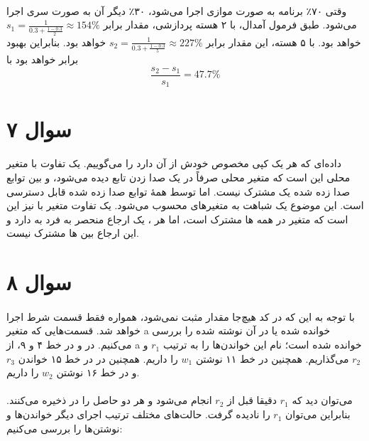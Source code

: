 \documentclass{article}
\begin{document}
	\paragraph*{}
	وقتی ۷۰٪ برنامه به صورت موازی اجرا می‌شود، ۳۰٪ دیگر آن به صورت سری اجرا می‌شود. طبق فرمول آمدال، با ۲ هسته پردازشی، مقدار
	برابر
	$s_1 = \frac{1}{0.3 + \frac{1 - 0.3}{2}} \approx 154\%$
	خواهد بود. با ۵ هسته، این مقدار برابر
	$s_2 = \frac{1}{0.3 + \frac{1 - 0.3}{5}} \approx 227\%$
	خواهد بود. بنابراین بهبود
	برابر خواهد بود با
	\begin{equation*}
		\frac{s_2 - s_1}{s_1} = 47.7\%
	\end{equation*}

	\section*{سوال ۷}
	\paragraph*{}
	داده‌ای که هر
	یک کپی مخصوص خودش از آن دارد را
	می‌گوییم. یک تفاوت
	با متغیر محلی این است که متغیر محلی صرفاً در یک صدا زدن تابع دیده می‌شود، و بین توابع صدا زده شده یک
	مشترک نیست. اما
	توسط همهٔ توابع صدا زده شده قابل دسترسی است. این موضوع یک شباهت به متغیرهای
	محسوب می‌شود. یک تفاوت متغیر
	با
	نیز این است که متغیر
	در همه
	ها
	مشترک است، اما هر
	،
	یک ارجاع منحصر به فرد به
	دارد و این ارجاع بین
	ها
	مشترک نیست.

	\section*{سوال ۸}
	\paragraph*{}
	با توجه به این که در کد هیچ‌جا مقدار
	مثبت نمی‌شود، همواره فقط قسمت
	شرط اجرا خواهد شد. قسمت‌هایی که متغیر a خوانده شده یا در آن نوشته شده را بررسی می‌کنیم. در
	و در خط ۴ و ۹، از a خوانده شده است؛ نام این خواندن‌ها را به ترتیب
	$r_1$
	و
	$r_2$
	می‌گذاریم. همچنین در خط ۱۱ نوشتن
	$w_1$
	را داریم. همچنین در
	در خط ۱۵ خواندن
	$r_3$
	و در خط ۱۶ نوشتن
	$w_2$
	را داریم.

	\paragraph*{}
	می‌توان دید که
	$r_1$
	دقیقا قبل از
	$r_2$
	انجام می‌شود و هر دو حاصل را در
	ذخیره می‌کنند. بنابراین می‌توان
	$r_1$
	را نادیده گرفت. حالت‌های مختلف ترتیب اجرای دیگر خواندن‌ها و نوشتن‌ها را بررسی می‌کنیم:
\end{document}
